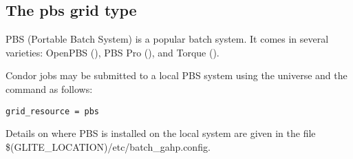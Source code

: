 
\subsection{\label{sec:PBS}The pbs grid type }

PBS (Portable Batch System) is a popular batch system. It comes in
several varieties: OpenPBS (),
PBS Pro (), and
Torque
().

Condor jobs may be submitted to a local PBS system
using the  universe and the
 command as follows:
\begin{verbatim}
grid_resource = pbs
\end{verbatim}

Details on where PBS is installed on the local system are
given in the file \$(GLITE\_LOCATION)/etc/batch\_gahp.config.
